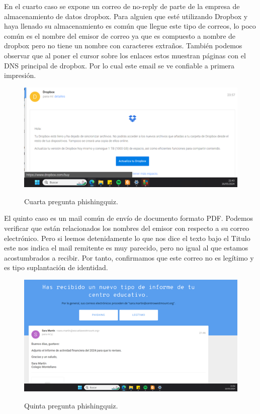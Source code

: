 \documentclass[stu, 11pt, letterpaper, donotrepeattitle, floatsintext, natbib]{apa7}
\begin{document}
En el cuarto caso se expone un correo de no-reply de parte de la empresa de almacenamiento de datos dropbox. Para alguien que esté utilizando Dropbox y haya llenado su almacenamiento es común que llegue este tipo de correos, lo poco común es el nombre del emisor de correo ya que es compuesto a nombre de dropbox pero no tiene un nombre con caracteres extraños. También podemos observar que al poner el cursor sobre los enlaces estos muestran páginas con el DNS principal de dropbox. Por lo cual este email se ve confiable a primera impresión.

\begin{figure}[H]
    \centering
    \caption{Cuarta pregunta phishingquiz.}
    \includegraphics[width=0.75\linewidth]{phishing7.png} %
    \label{fig:OverallEffect}
\end{figure}

El quinto caso es un mail común de envío de documento formato PDF. Podemos verificar que están relacionados los nombres del emisor con respecto a su correo electrónico.  Pero si leemos detenidamente lo que nos dice el texto bajo el Titulo este nos indica el mail remitente es muy parecido, pero no igual al que estamos acostumbrados a recibir. Por tanto, confirmamos que este correo no es legítimo y es tipo suplantación de identidad.

\begin{figure}[H]
    \centering
    \caption{Quinta pregunta phishingquiz.}
    \includegraphics[width=0.75\linewidth]{phishing8.png} %
    \label{fig:OverallEffect}
\end{figure}
\end{document}
